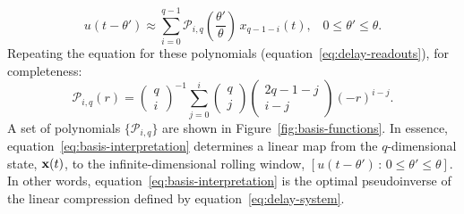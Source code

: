\begin{equation} \label{eq:basis-interpretation}
\boxed{u(t - \theta') \approx \sum_{i=0}^{q-1} \mathcal{P}_{i,q} \left(\frac{\theta'}{\theta} \right) \, x_{q-1-i}(t) \text{,} \quad 0 \le \theta' \le \theta \text{.} }
\end{equation}
Repeating the equation for these polynomials (equation~\ref{eq:delay-readouts}), for completeness:
\begin{equation} \label{eq:basis-functions}
\mathcal{P}_{i,q}(r) = \begin{pmatrix}q \\ i\end{pmatrix}^{-1} \sum_{j=0}^i \begin{pmatrix}q \\ j\end{pmatrix} \begin{pmatrix}2q - 1 - j \\ i - j\end{pmatrix} \left( -r \right)^{i - j} \text{.} %
\end{equation}
A set of polynomials $\{ \mathcal{P}_{i, q} \}$ are shown in Figure~\ref{fig:basis-functions}.
In essence, equation~\ref{eq:basis-interpretation} determines a linear map from the $q$-dimensional state, $\mathbf{x}(t)$, to the infinite-dimensional rolling window, $[ u(t - \theta') \,:\, 0 \le \theta' \le \theta ]$.
In other words, equation~\ref{eq:basis-interpretation} is the optimal pseudoinverse of the linear compression defined by equation~\ref{eq:delay-system}.

